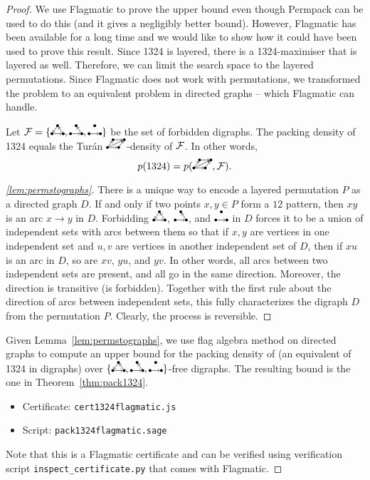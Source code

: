 \documentclass[12pt, a4paper, twoside]{report}
\begin{document}
\begin{proof}
We use Flagmatic to prove the upper bound even though Permpack can be used to do this (and it gives a negligibly better bound). However, Flagmatic has been available for a long time and we would like to show how it could have been used to prove this result. Since 1324 is layered, there is a 1324-maximiser that is layered as well. Therefore, we can limit the search space to the layered permutations. Since Flagmatic does not work with permutations, we transformed the problem to an equivalent problem in directed graphs -- which Flagmatic can handle. 
\begin{lemma}
\label{lem:permstographs}
Let $\F = \{\dicycle, \twochain, \orcocherry\}$ be the set of forbidden digraphs.  The packing density of 1324 equals the Tur\'an $\digraphacbd$-density of $\mathcal{F}$. In other words, $$p(1324)= p(\digraphacbd, \F).$$
\end{lemma}
\begin{proof}[\ref{lem:permstographs}]
There is a unique way to encode a layered permutation $P$ as a directed graph $D$. If and only if two points $x,y \in P$ form a $12$ pattern, then $xy$ is an arc $x \to y$ in $D$. Forbidding $\dicycle$, $\twochain$, and $\orcocherry$ in $D$ forces it to be a union of independent sets with arcs between them so that if $x,y$ are vertices in one independent set and $u,v$ are vertices in another independent set of $D$, then if $xu$ is an arc in $D$, so are $xv$, $yu$, and $yv$. In other words, all arcs between two independent sets are present, and all go in the same direction. Moreover, the direction is transitive (\dicycle is forbidden). Together with the first rule about the direction of arcs between independent sets, this fully characterizes the digraph $D$ from the permutation $P$. Clearly, the process is reversible.
\end{proof}

Given Lemma~\ref{lem:permstographs}, we use flag algebra method on directed graphs to compute an upper bound for the packing density of \digraphacbd (an equivalent of 1324 in digraphs) over $\{\dicycle, \twochain, \orcocherry\}$-free digraphs. The resulting bound is the one in Theorem~\ref{thm:pack1324}.
\begin{itemize}
\item Certificate: \texttt{cert1324flagmatic.js}
\item Script: \texttt{pack1324flagmatic.sage}
\end{itemize}
Note that this is a Flagmatic certificate and can be verified using verification script \texttt{inspect\_certificate.py} that comes with Flagmatic.


\end{proof}
\end{document}
